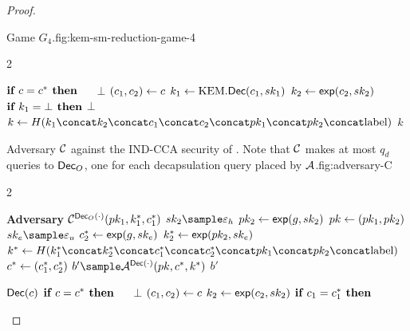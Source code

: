 \begin{proof}
\begin{itemize}
\begin{gamefigure}{Game $G_4$.}{fig:kem-sm-reduction-game-4}
\begin{games}{2}
                \gamebreak

                \begin{gameenv}{\oracledec}
                    \State $\textbf{if } c = c^* \textbf{ then}$
                    \State $\quad$ \Return $\bot$
                    \State $(c_1, c_2) \leftarrow c$
                    \State $k_1 \leftarrow \text{KEM}.\textsf{Dec}(c_1, sk_1)$
                    \State $k_2 \leftarrow \textsf{exp}(c_2, sk_2)$
                    \State $\textbf{if } k_1 = \bot \textbf{ then}$
                    \State \quad \Return $\bot$
                    \State $k \assign H(\hashinput)$
                    \State \Return $k$
                \end{gameenv}
            \end{games}
        \end{gamefigure}
        \begin{gamefigure}{Adversary $\mathcal{C}$ against the IND-CCA
                security of \kem. Note that $\mathcal{C}$ makes at most $q_d$ queries
                to $\textsf{Dec}_O$, one for each decapsulation query placed by
                $\mathcal{A}$.}{fig:adversary-C}
            \begin{games}{2}
                \begin{gameenv}{\textbf{Adversary} $\mathcal{C}^{\textsf{Dec}_O(\cdot)}(pk_1, k^*_1, c^*_1)$}
                    \State $\sk_2 \sample \honestexponent$
                    \State $pk_2 \leftarrow \textsf{exp}(g, sk_2)$
                    \State $pk \leftarrow (pk_1, pk_2)$
                    \State $\sk_e \sample \exponent$
                    \State $c^*_2 \leftarrow \textsf{exp}(g, sk_e)$
                    \State $k^*_2 \leftarrow \textsf{exp}(pk_2, sk_e)$
                    \State $k^* \assign H(\hashinputchallenges)$ \label{line:b-real-ug}
                    \State {} \label{line:c-sampled-ug}
                    \State $c^* \leftarrow (c_1^*, c_2^*)$
                    \State $b' \sample \adversary{A}^{\dec(\cdot)}(\pk, c^*, k^*)$
                    \State \Return $b'$
                \end{gameenv}
                \gamebreak
                \begin{gameenv}{\oracle $\textsf{Dec}(c)$}
                    \State $\textbf{if } c = c^* \textbf{ then}$
                    \State $\quad$ \Return $\bot$
                    \State $(c_1, c_2) \leftarrow c$
                    \State $k_2 \leftarrow \textsf{exp}(c_2, sk_2)$
                    \State $\textbf{if } c_1 = c^*_1 \textbf{ then}$

\end{gameenv}
\end{games}
\end{gamefigure}
\end{itemize}
\end{proof}
